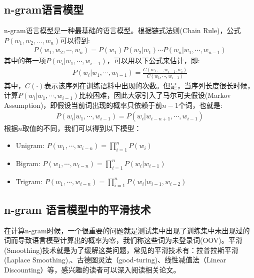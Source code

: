 \subsection{n-gram语言模型}
n-gram语言模型是一种最基础的语言模型。根据链式法则(Chain Rule)，公式$P(w_1, w_2, ..., w_n)$可以得到:
\begin{equation} \nonumber
\label{equ:ab}
\begin{aligned}
P(w_1, w_2, \cdots, w_n)=P(w_1)P(w_2|w_1)\cdots P(w_n|w_1,\cdots,w_{n-1})
\end{aligned}
\end{equation}
其中的每一项$P(w_i|w_1,\cdots,w_{i-1})$，可以用以下公式来估计，即:
\begin{equation} \nonumber
\label{equ:ab}
\begin{aligned}
P(w_i|w_1,\cdots,w_{i-1}) = \frac{C(w_1,\cdots, w_{i-1}, w_i) }{C(w_1,\cdots,w_{i-1})}
\end{aligned}
\end{equation}
其中，$C(\cdot)$表示该序列在训练语料中出现的次数。但是，当序列长度很长时候，计算$P(w_i|w_1,\cdots,w_{i-1})$比较困难，因此大家引入了马尔可夫假设(Markov Assumption)，即假设当前词出现的概率只依赖于前$n-1$个词，也就是:
\begin{equation} \nonumber
\label{equ:ab}
\begin{aligned}
P(w_i|w_1,\cdots,w_{i-1}) = P(w_i|w_{i-n+1},\cdots,w_{i-1})
\end{aligned}
\end{equation}
根据$n$取值的不同，我们可以得到以下模型：
\begin{itemize}
    \item Unigram: $P(w_1, \cdots, w_{i-n})=\prod_{i=1}^{n} P(w_i)$
	\item Bigram: $P(w_1, \cdots, w_{i-n})=\prod_{i=1}^{n} P(w_i|w_{i-1})$
	\item Trigram: $P(w_1, \cdots, w_{i-n})=\prod_{i=1}^{n} P(w_i|w_{i-1},w_{i-2})$
\end{itemize}

\subsection{n-gram 语言模型中的平滑技术}
在计算n-gram时候，一个很重要的问题就是测试集中出现了训练集中未出现过的词而导致语言模型计算出的概率为零，我们称这些词为未登录词(OOV)。平滑(Smoothing)技术就是为了缓解这类问题，常见的平滑技术有：拉普拉斯平滑(Laplace Smoothing),、古德图灵法（good-turing)、线性减值法（Linear Discounting）等，感兴趣的读者可以深入阅读相关论文。

